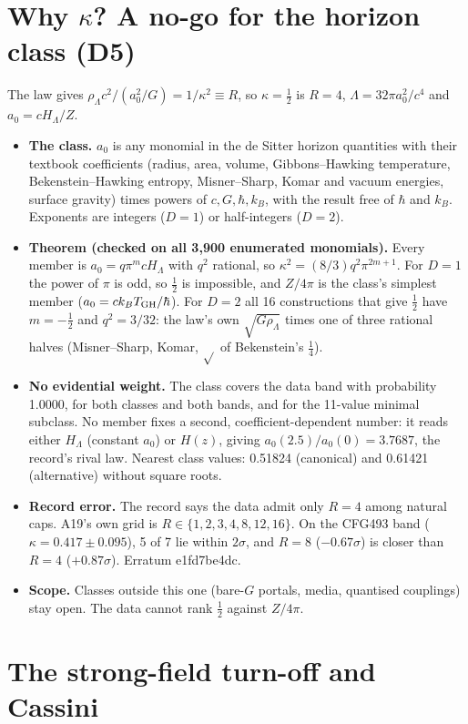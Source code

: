 \documentclass[10pt]{article}
\begin{document}
\section{Why $\kappa$? A no-go for the horizon class (D5)}
The law gives $\rho_\Lambda c^2/(a_0^2/G)=1/\kappa^2\equiv R$, so $\kappa=\tfrac12$ is $R=4$, $\Lambda=32\pi a_0^2/c^4$ and $a_0=cH_\Lambda/Z$.
\begin{itemize}
\item \textbf{The class.} $a_0$ is any monomial in the de Sitter horizon quantities with their textbook coefficients (radius, area, volume, Gibbons--Hawking temperature, Bekenstein--Hawking entropy, Misner--Sharp, Komar and vacuum energies, surface gravity) times powers of $c,G,\hbar,k_B$, with the result free of $\hbar$ and $k_B$. Exponents are integers ($D=1$) or half-integers ($D=2$).
\item \textbf{Theorem (checked on all 3,900 enumerated monomials).} Every member is $a_0=q\pi^m cH_\Lambda$ with $q^2$ rational, so $\kappa^2=(8/3)q^2\pi^{2m+1}$. For $D=1$ the power of $\pi$ is odd, so $\tfrac12$ is impossible, and $Z/4\pi$ is the class's simplest member ($a_0=ck_BT_{\rm GH}/\hbar$). For $D=2$ all 16 constructions that give $\tfrac12$ have $m=-\tfrac12$ and $q^2=3/32$: the law's own $\sqrt{G\rho_\Lambda}$ times one of three rational halves (Misner--Sharp, Komar, $\sqrt{}$ of Bekenstein's $\tfrac14$).
\item \textbf{No evidential weight.} The class covers the data band with probability 1.0000, for both classes and both bands, and for the 11-value minimal subclass. No member fixes a second, coefficient-dependent number: it reads either $H_\Lambda$ (constant $a_0$) or $H(z)$, giving $a_0(2.5)/a_0(0)=3.7687$, the record's rival law. Nearest class values: 0.51824 (canonical) and 0.61421 (alternative) without square roots.
\item \textbf{Record error.} The record says the data admit only $R=4$ among natural caps. A19's own grid is $R\in\{1,2,3,4,8,12,16\}$. On the CFG493 band ($\kappa=0.417\pm0.095$), 5 of 7 lie within $2\sigma$, and $R=8$ ($-0.67\sigma$) is closer than $R=4$ ($+0.87\sigma$). Erratum e1fd7be4dc.
\item \textbf{Scope.} Classes outside this one (bare-$G$ portals, media, quantised couplings) stay open. The data cannot rank $\tfrac12$ against $Z/4\pi$.
\end{itemize}

\section{The strong-field turn-off and Cassini}\label{sec:cassini}
\end{document}
